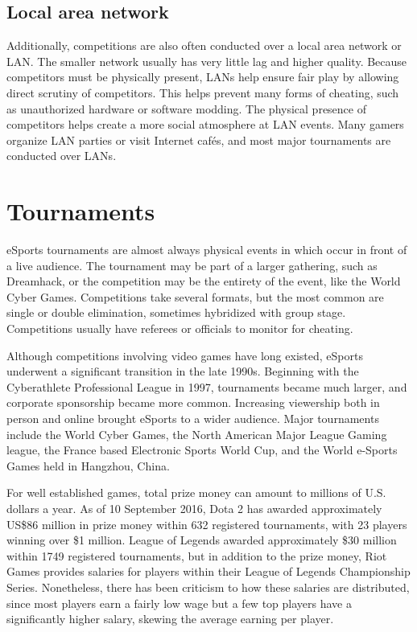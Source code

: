 	\subsection{Local area network}
		Additionally, competitions are also often conducted over a local area network or LAN. The smaller network usually has very little lag and higher quality. Because competitors must be physically present, LANs help ensure fair play by allowing direct scrutiny of competitors. This helps prevent many forms of cheating, such as unauthorized hardware or software modding. The physical presence of competitors helps create a more social atmosphere at LAN events. Many gamers organize LAN parties or visit Internet cafés, and most major tournaments are conducted over LANs.
		
		\newpage
\section{Tournaments}
		eSports tournaments are almost always physical events in which occur in front of a live audience. The tournament may be part of a larger gathering, such as Dreamhack, or the competition may be the entirety of the event, like the World Cyber Games. Competitions take several formats, but the most common are single or double elimination, sometimes hybridized with group stage. Competitions usually have referees or officials to monitor for cheating.
		
		Although competitions involving video games have long existed, eSports underwent a significant transition in the late 1990s. Beginning with the Cyberathlete Professional League in 1997, tournaments became much larger, and corporate sponsorship became more common. Increasing viewership both in person and online brought eSports to a wider audience. Major tournaments include the World Cyber Games, the North American Major League Gaming league, the France based Electronic Sports World Cup, and the World e-Sports Games held in Hangzhou, China.
		
		For well established games, total prize money can amount to millions of U.S. dollars a year. As of 10 September 2016, Dota 2 has awarded approximately US\$86 million in prize money within 632 registered tournaments, with 23 players winning over \$1 million. League of Legends awarded approximately \$30 million within 1749 registered tournaments, but in addition to the prize money, Riot Games provides salaries for players within their League of Legends Championship Series. Nonetheless, there has been criticism to how these salaries are distributed, since most players earn a fairly low wage but a few top players have a significantly higher salary, skewing the average earning per player.
		
